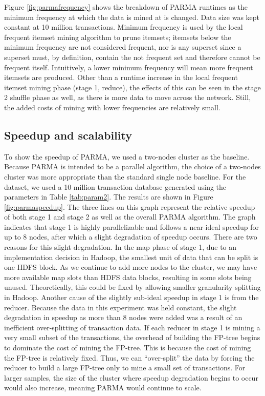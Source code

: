 Figure \ref{fig:parmafrequency} shows the breakdown of PARMA runtimes as
the minimum frequency at which the data is mined at is changed. Data
size was kept constant at 10 million transactions. Minimum frequency
is used by the local frequent itemset mining algorithm to prune
itemsets; itemsets below the minimum frequency are not considered
frequent, nor is any superset since a superset must, by definition,
contain the not frequent set and therefore cannot be frequent
itself. Intuitively, a lower minimum frequency will mean more frequent
itemsets are produced. Other than a runtime increase in the local
frequent itemset mining phase (stage 1, reduce), the effects of this
can be seen in the stage 2 shuffle phase as well, as there is more
data to move across the network. Still, the added costs of mining with
lower frequencies are relatively small.

\subsection{Speedup and scalability}
To show the speedup of PARMA, we used a two-nodes cluster as the
baseline. Because PARMA is intended to be a parallel algorithm, the choice of a
two-nodes cluster was more appropriate than the standard single node
baseline. For the dataset, we used a 10 million transaction database
generated using the parameters in Table \ref{tab:param2}. The results
are shown in Figure \ref{fig:parmaspeedup}. The three lines on this graph
represent the relative speedup of both stage 1 and stage 2 as well as
the overall PARMA algorithm. The graph indicates that stage 1 is highly
parallelizable and follows a near-ideal speedup for up to 8 nodes,
after which a slight degradation of speedup occurs. There are two
reasons for this slight degradation. In the map phase of stage 1, due
to an implementation decision in Hadoop, the smallest unit of data
that can be split is one HDFS block. As we continue to add more nodes
to the cluster, we may have more available map slots than HDFS data
blocks, resulting in some slots being unused. Theoretically, this
could be fixed by allowing smaller granularity splitting in
Hadoop. Another cause of the slightly sub-ideal speedup in stage 1 is
from the reducer. Because the data in this experiment was held
constant, the slight degradation in speedup as more than 8 nodes were
added was a result of an inefficient over-splitting of transaction
data. If each reducer in stage 1 is mining a very small subset of the
transactions, the overhead of building the FP-tree begins to dominate
the cost of mining the FP-tree. This is because the cost of mining the
FP-tree is relatively fixed. Thus, we can ``over-split'' the data by
forcing the reducer to build a large FP-tree only to mine a small set
of transactions. For larger samples, the size of the cluster where
speedup degradation begins to occur would also increase, meaning PARMA
would continue to scale.


